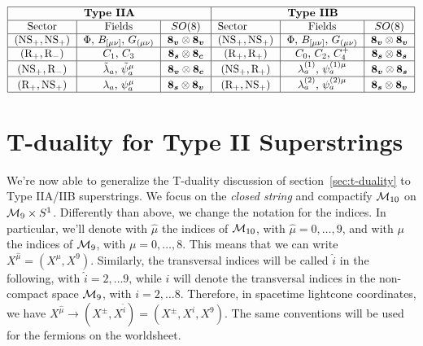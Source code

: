 \begin{equation*}
        \begin{tabular}{|ccc|ccc|}
        \hline
        \multicolumn{3}{|c|}{\textbf{Type IIA}} & \multicolumn{3}{c|}{\textbf{Type IIB}} \\ \hline
        \multicolumn{1}{|c|}{Sector}  & Fields & \multicolumn{1}{|c|}{$SO(8)$} & \multicolumn{1}{l|}{Sector}  & Fields & \multicolumn{1}{|c|}{$SO(8)$}  \\ \hline
        \multicolumn{1}{|c|}{$(\text{NS}_+, \text{NS}_+)$} & $\Phi$, $B_{[\mu\nu]}$, $G_{(\mu\nu)}$ & \multicolumn{1}{|c|}{$\v \otimes \v$} & \multicolumn{1}{c|}{$(\text{NS}_+, \text{NS}_+)$}        &      $\Phi$, $B_{[\mu\nu]}$, $G_{(\mu\nu)}$  & \multicolumn{1}{|c|}{$\v \otimes \v$} \\ \hline
        \multicolumn{1}{|c|}{$(\text{R}_+, \text{R}_-)$} &$C_1$, $C_3$  & \multicolumn{1}{|c|}{$\s\otimes\c$} & \multicolumn{1}{c|}{$(\text{R}_+, \text{R}_+)$}        &    $C_0$, $C_2$, $C_4^+$   & \multicolumn{1}{|c|}{$\s\otimes\s$}  \\ \hline
        \multicolumn{1}{|c|}{$(\text{NS}_+,\text{R}_-)$}        &     $\tilde{\lambda}_a$, $\tilde{\psi}^\mu_a$  & \multicolumn{1}{|c|}{$\v\otimes\c$}  & \multicolumn{1}{c|}{$(\text{NS}_+,\text{R}_+)$}        &     ${\lambda}^{(1)}_a$, ${\psi}^{(1)\mu}_a$  & \multicolumn{1}{|c|}{$\v\otimes\s$}  \\ \hline


        \multicolumn{1}{|c|}{$(\text{R}_+, \text{NS}_+)$}        &     ${\lambda}_a$, ${\psi}^\mu_a$ & \multicolumn{1}{|c|}{$\s\otimes\v$}   & \multicolumn{1}{c|}{$(\text{R}_+, \text{NS}_+)$}        &     ${\lambda}^{(2)}_a$, ${\psi}^{(2)\mu}_a$  & \multicolumn{1}{|c|}{$\s\otimes\v$}  \\ \hline
        \end{tabular}
\end{equation*}

\section{T-duality for Type II Superstrings}
We're now able to generalize the T-duality discussion of section~\ref{sec:t-duality} to Type IIA/IIB superstrings. We focus on the \emph{closed string} and compactify $\mathcal{M}_{10}$ on $\mathcal{M}_{9} \times S^1$. Differently than above, we change the notation for the indices. In particular, we'll denote with $\hat{\mu}$ the indices of $\mathcal{M}_{10}$, with $\hat{\mu} = 0, \dots, 9$, and with $\mu$ the indices of $\mathcal{M}_{9}$, with $\mu = 0, \dots , 8$. This means that we can write $X^{\hat{\mu}} = (X^\mu, X^{9})$. Similarly, the transversal indices will be called $\hat{i}$ in the following, with $\hat{i} = 2, \dots 9$, while $i$ will denote the transversal indices in the non-compact space $\mathcal{M}_{9}$, with $i = 2, \dots 8$. Therefore, in spacetime lightcone coordinates, we have $X^{\hat{\mu}} \to (X^\pm, X^{\hat{i}}) = (X^\pm, X^i, X^{9})$. The same conventions will be used for the fermions on the worldsheet.


